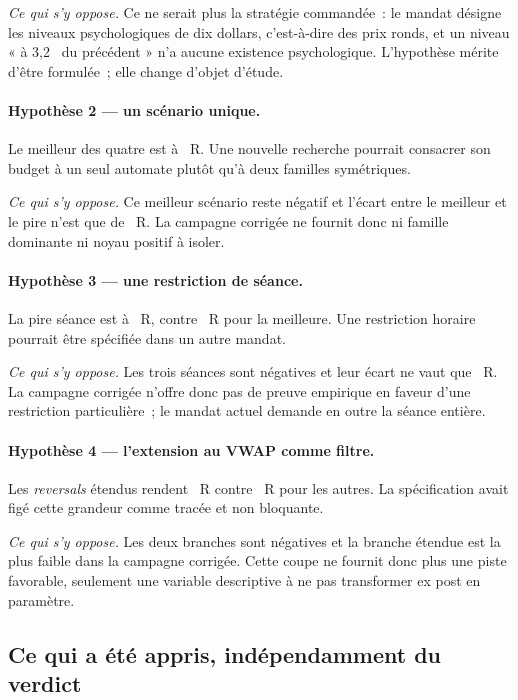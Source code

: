 \emph{Ce qui s'y oppose.} Ce ne serait plus la stratégie commandée~: le
mandat désigne les niveaux psychologiques de dix dollars, c'est-à-dire des
prix ronds, et un niveau « à 3,2~ du précédent » n'a aucune
existence psychologique. L'hypothèse mérite d'être formulée~; elle change
d'objet d'étude.

\paragraph{Hypothèse 2 --- un scénario unique.}
Le meilleur des quatre est \XTenBestScenarioName{} à
\XTenBestScenarioR{}~R. Une nouvelle recherche pourrait consacrer son budget à
un seul automate plutôt qu'à deux familles symétriques.

\emph{Ce qui s'y oppose.} Ce meilleur scénario reste négatif et l'écart entre
le meilleur et le pire n'est que de \XTenScenarioSpreadR{}~R. La campagne
corrigée ne fournit donc ni famille dominante ni noyau positif à isoler.

\paragraph{Hypothèse 3 --- une restriction de séance.}
La pire séance est \XTenWorstSessionName{} à \XTenWorstSessionR{}~R, contre
\XTenBestSessionR{}~R pour la meilleure. Une restriction horaire pourrait être
spécifiée dans un autre mandat.

\emph{Ce qui s'y oppose.} Les trois séances sont négatives et leur écart ne
vaut que \XTenSessionSpreadR{}~R. La campagne corrigée n'offre donc pas de
preuve empirique en faveur d'une restriction particulière~; le mandat actuel
demande en outre la séance entière.

\paragraph{Hypothèse 4 --- l'extension au VWAP comme filtre.}
Les \emph{reversals} étendus rendent \XTenExtendedR{}~R contre
\XTenNotExtendedR{}~R pour les autres. La spécification avait figé cette
grandeur comme tracée et non bloquante.

\emph{Ce qui s'y oppose.} Les deux branches sont négatives et la branche
étendue est la plus faible dans la campagne corrigée. Cette coupe ne fournit
donc plus une piste favorable, seulement une variable descriptive à ne pas
transformer ex post en paramètre.

\subsection{Ce qui a été appris, indépendamment du verdict}

